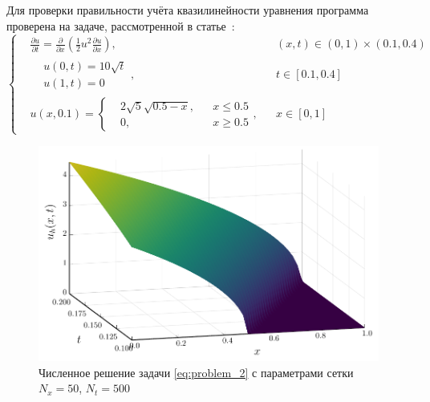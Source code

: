 Для проверки правильности учёта квазилинейности уравнения программа проверена на задаче, рассмотренной в статье~\cite{самарский1963примеры}:
\begin{equation*}
    \left\{
        \begin{aligned}
            &\frac{\partial u}{\partial t} = \frac{\partial }{\partial x}\left( \frac{1}{2}u^2 \frac{\partial u}{\partial x} \right), && (x, t) \in (0, 1)\times(0.1, 0.4)\\
            &\begin{aligned}
            &u(0, t) = 10\sqrt{t}\\
            &u(1, t) = 0
            \end{aligned}, && t\in [0.1, 0.4]\\
            &u(x, 0.1) = \left\{ \begin{aligned}
                &2\sqrt{5}\sqrt{0.5 - x}, && x \le 0.5\\
                & 0, && x\ge 0.5
            \end{aligned}\right. , && x \in [0, 1]
        \end{aligned}
    \right.
\end{equation*}
\begin{figure}
    \centering
    \includegraphics{Разностные_схемы_на_статических_сетках/Программный_код_примеры_расчётов/explicit_scheme/problem_2_implicit_surface.pdf}
    \caption{Численное решение задачи \eqref{eq:problem_2} с параметрами сетки $N_x = 50$, $N_t = 500$}
    \label{fig:problem_2_implicit_surface}
\end{figure}
